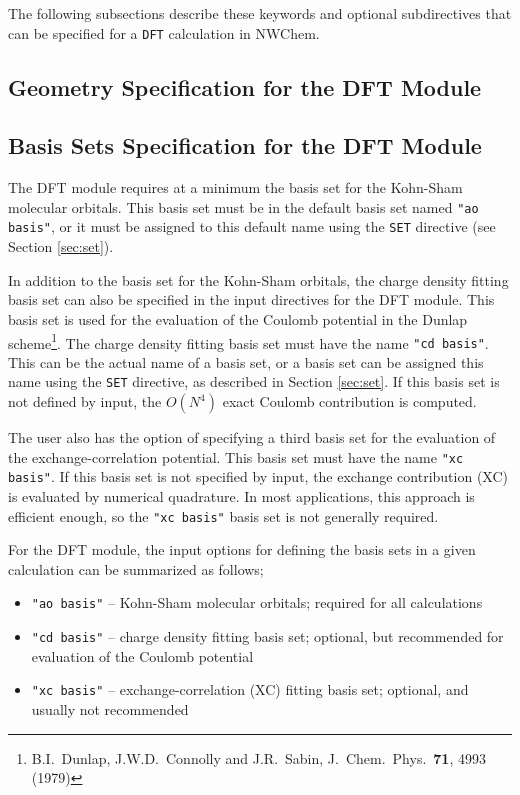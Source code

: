 The following 
subsections describe these keywords and
optional subdirectives that can be specified for a \verb+DFT+ calculation
in NWChem.

\subsection{Geometry Specification for the DFT Module}

\subsection{Basis Sets Specification for the DFT Module}
The DFT module requires at a minimum the basis set for the Kohn-Sham 
molecular orbitals.  This basis set must be in the default basis set named
{\tt "ao basis"}, or it must be assigned to this default name using the
\verb+SET+ directive (see Section \ref{sec:set}).

In addition to the basis set for the Kohn-Sham orbitals, 
the charge density fitting basis set can also be specified in the 
input directives for the DFT module.  This basis set is used for the 
evaluation of the Coulomb potential in the Dunlap scheme\footnote{B.I.~Dunlap, 
J.W.D.~Connolly and J.R.~Sabin, J.~Chem.~Phys.~{\bf 71},  4993 (1979)}.
The charge density fitting basis set must have the name {\tt "cd basis"}.
This can be the actual name of a basis set, or a basis set can be 
assigned this name using the \verb+SET+ directive, as described in
Section \ref{sec:set}.  If this basis set is not defined by input,
the $O(N^4)$ exact Coulomb contribution is computed.

The user also has the option of specifying a third basis set for the 
evaluation of the exchange-correlation potential.  This basis set must
have the name {\tt "xc basis"}.  If this basis set is not specified
by input, the exchange contribution (XC) is evaluated by numerical
quadrature.  In most applications, this approach is efficient enough,
so the {\tt "xc basis"} basis set is not generally required.

For the DFT module, the input options for defining the basis sets in a given
calculation can be summarized as follows;

\begin{itemize}
\item {\tt "ao basis"} -- Kohn-Sham molecular orbitals; required for all 
calculations

\item {\tt "cd basis"} -- charge density fitting basis set; optional, but
recommended for evaluation of the Coulomb potential

\item {\tt "xc basis"} -- exchange-correlation (XC) fitting basis set; 
optional, and usually not recommended

\end{itemize}


